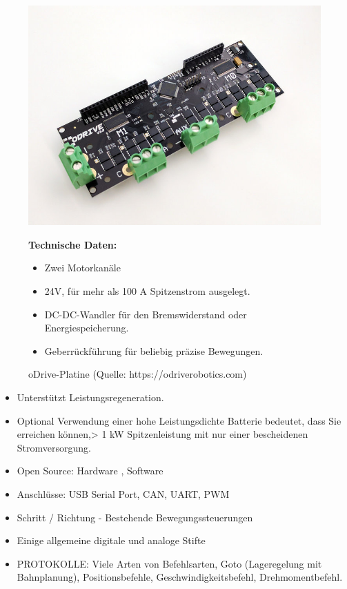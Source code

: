 \begin{figure}[htb]
	\centering
	\begin{minipage}{0.38\linewidth}
		\centering
		\includegraphics[scale=0.2]{images/odrive.jpeg}
		\caption{oDrive-Platine  \newline (Quelle: https://odriverobotics.com)}
		\label{odrive}
	\end{minipage}
 \begin{minipage}[h]{0.6\textwidth}
	\textbf{Technische Daten:} 
	\begin{itemize} 
		\item Zwei Motorkanäle
		\item 24V, für mehr als 100 A Spitzenstrom ausgelegt.
		\item DC-DC-Wandler für den Bremswiderstand oder Energiespeicherung.
		\item Geberrückführung für beliebig präzise Bewegungen.
		
	\end{itemize}
\end{minipage}
\end{figure}

\begin{itemize} 
\item Unterstützt Leistungsregeneration.
\item Optional Verwendung einer hohe Leistungsdichte Batterie bedeutet, dass Sie erreichen können,> 1 kW Spitzenleistung mit nur einer bescheidenen Stromversorgung.
\item Open Source: Hardware , Software
\item Anschlüsse: USB Serial Port, CAN, UART, PWM
\item Schritt / Richtung - Bestehende Bewegungssteuerungen
\item Einige allgemeine digitale und analoge Stifte
\item PROTOKOLLE: Viele Arten von Befehlsarten, 
Goto (Lageregelung mit Bahnplanung), 
Positionsbefehle, 
Geschwindigkeitsbefehl, 
Drehmomentbefehl.
\end{itemize}

